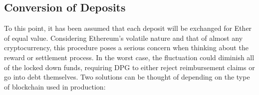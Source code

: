 
\subsection{Conversion of Deposits}
\label{sec:depositConversion}
To this point, it has been assumed that each deposit will be exchanged for Ether of equal value. Considering Ethereum's volatile nature and that of almost any cryptocurrency, this procedure poses a serious concern when thinking about the reward or settlement process. In the worst case, the fluctuation could diminish all of the locked down funds, requiring \ac{DPG} to either reject reimbursement claims or go into debt themselves. Two solutions can be thought of depending on the type of blockchain used in production:


